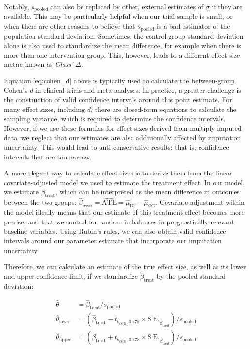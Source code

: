 Notably, $s_{\text{pooled}}$ can also be replaced by other, external estimates of $\sigma$ if they are available. This may be particularly helpful when our trial sample is small, or when there are other reasons to believe that $s_{\text{pooled}}$ is a bad estimator of the population standard deviation. Sometimes, the control group standard deviation alone is also used to standardize the mean difference, for example when there is more than one intervention group. This, however, leads to a different effect size metric known as \emph{Glass'} $\Delta$.

Equation \ref{eq:cohen_d} above is typically used to calculate the between-group Cohen's $d$ in clinical trials and meta-analyses. In practice, a  greater challenge is the construction of valid confidence intervals around this point estimate. For many effect sizes, including $d$, there are closed-form equations to calculate the sampling variance, which is required to determine the confidence intervals. However, if we use these formulas for effect sizes derived from multiply imputed data, we neglect that our estimates are also additionally affected by imputation uncertainty. This would lead to anti-conservative results; that is, confidence intervals that are too narrow. 

A more elegant way to calculate effect sizes is to derive them from the linear covariate-adjusted model we used to estimate the treatment effect. In our model, we estimate $\beta_{\text{treat}}$, which can be interpreted as the mean difference in outcomes between the two groups: $\hat\beta_{\text{treat}} 
= \widehat{\text{ATE}} = \hat\mu_{\text{IG}} - \hat\mu_{\text{CG}}$. Covariate adjustment within the model ideally means that our estimate of this treatment effect becomes more precise, and that we control for random imbalances in prognostically relevant baseline variables. Using Rubin's rules, we can also obtain valid confidence intervals around our parameter estimate that incorporate our imputation uncertainty. 

Therefore, we can calculate an estimate of the true effect size, as well as its lower and upper confidence limit, if we standardize $\hat\beta_{\text{treat}}$ by the pooled standard deviation:

\begin{align}
\hat\theta &= \hat\beta_{\text{treat}} / s_{\text{pooled}} \\
\hat\theta_{\text{lower}} &= (\hat\beta_{\text{treat}} - t_{\nu_{\text{(MI)}},\text{0.975}} \times \text{S.E.}_{\hat\beta_{\text{treat}}}) / s_{\text{pooled}} \\
\hat\theta_{\text{upper}} &= (\hat\beta_{\text{treat}} + t_{\nu_{\text{(MI)}},\text{0.975}} \times \text{S.E.}_{\hat\beta_{\text{treat}}}) / s_{\text{pooled}}
\end{align}

